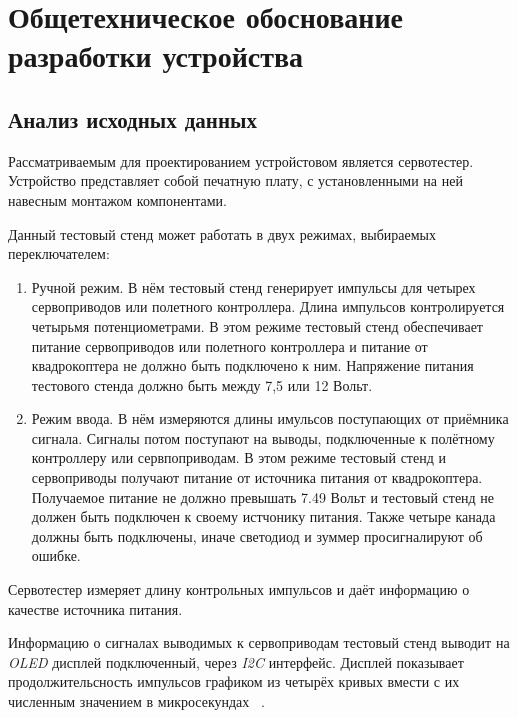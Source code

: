 
\section{Общетехническое обоснование \\ разработки устройства}

\subsection{Анализ исходных данных}

Рассматриваемым для проектированием устройстовом является сервотестер.
Устройство представляет собой печатную плату, с установленными на ней
навесным монтажом компонентами.

Данный тестовый стенд может работать в двух режимах, выбираемых переключателем:
\begin{enumerate} %
  
\item Ручной режим. В нём тестовый стенд генерирует импульсы для
четырех сервоприводов или полетного контроллера. Длина импульсов
контролируется четырьмя потенциометрами. В этом режиме тестовый стенд
обеспечивает питание сервоприводов или полетного контроллера и питание
от квадрокоптера не должно быть подключено к ним. Напряжение питания
тестового стенда должно быть между 7,5 или 12 Вольт.
  
\item Режим ввода. В нём измеряются длины имульсов поступающих от
приёмника сигнала. Сигналы потом поступают на выводы, подключенные к
полётному контроллеру или сервпоприводам.  В этом режиме тестовый
стенд и сервоприводы получают питание от источника питания от
квадрокоптера. Получаемое питание не должно превышать 7.49 Вольт и
тестовый стенд не должен быть подключен к своему истчонику
питания. Также четыре канада должны быть подключены, иначе светодиод и
зуммер просигналируют об ошибке.

\end{enumerate}

Сервотестер измеряет длину контрольных импульсов и даёт информацию о
качестве источника питания.


Информацию о сигналах выводимых к сервоприводам тестовый стенд выводит
на \textit{OLED} дисплей подключенный, через \textit{I2C} интерфейс.
Дисплей показывает продолжительсность импульсов графиком из четырёх
кривых вмести с их численным значением в микросекундах
~\cite{Elector521}.

